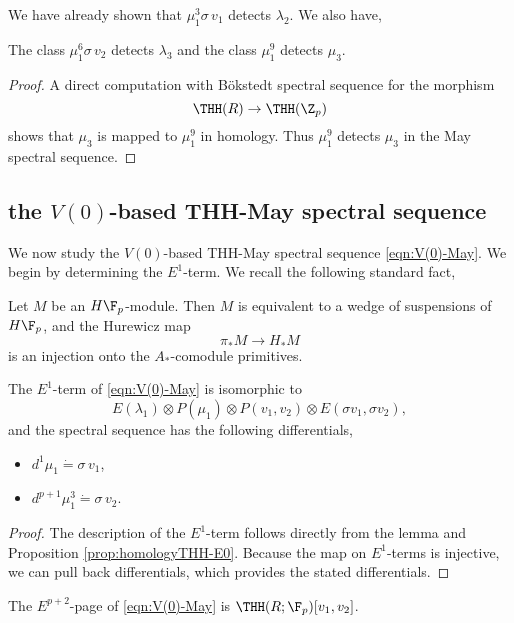 We have already shown that $\mu_1^3\sigma\, v_1$ detects $\lambda_2$. We also have, 

\begin{prop}
	The class $\mu_1^6\sigma\, v_2$ detects $\lambda_3$ and the class $\mu_1^9$ detects $\mu_3$.
\end{prop}
\begin{proof}
	A direct computation with B\"okstedt spectral sequence for the morphism
	\[
	\THH(R)\to \THH(\Z_p)
	\]
	shows that $\mu_3$ is mapped to $\mu_1^9$ in homology. Thus $\mu_1^9$ detects $\mu_3$ in the May spectral sequence.
\end{proof}

\subsection{the $V(0)$-based THH-May spectral sequence}


We now study the $V(0)$-based THH-May spectral sequence \eqref{eqn:V(0)-May}. We begin by determining the $E^1$-term. We recall the following standard fact, 

\begin{lem}
	Let $M$ be an $H\F_p$-module. Then $M$ is equivalent to a wedge of suspensions of $H\F_p$, and the Hurewicz map 
	\[
	\pi_*M\to H_*M
	\]
	is an injection onto the $A_*$-comodule primitives.
\end{lem}

\begin{prop}
	The $E^1$-term of \eqref{eqn:V(0)-May} is isomorphic to 
	\[
	E(\lambda_1)\otimes P(\mu_1)\otimes P(v_1,v_2)\otimes E(\sigma v_1, \sigma v_2),
	\]
	and the spectral sequence has the following differentials, 
	\begin{itemize}
		\item $d^1\mu_1 \dot{=} \sigma\, v_1$,
		\item $d^{p+1}\mu_1^3\dot{=} \sigma\, v_2$.
	\end{itemize}
\end{prop}
\begin{proof}
	The description of the $E^1$-term follows directly from the lemma and Proposition \ref{prop:homologyTHH-E0}. 
	Because the map on $E^1$-terms is injective, we can pull back differentials, which provides the stated differentials.
\end{proof}

\begin{cor}
	The $E^{p+2}$-page of \eqref{eqn:V(0)-May} is $\THH(R;\F_p)[v_1,v_2]$.
\end{cor}


